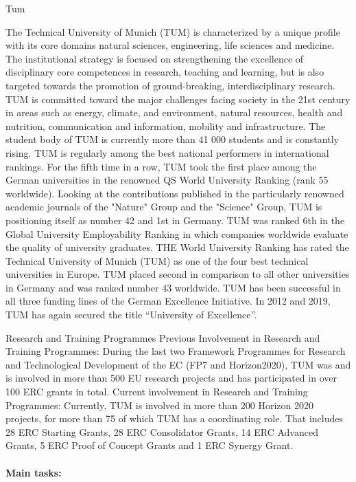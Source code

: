 \begin{sitedescription}{Tum}

The Technical University of Munich (TUM) is characterized by a unique profile with its core domains natural sciences, engineering, life sciences and medicine. The institutional strategy is focused on strengthening the excellence of disciplinary core competences in research, teaching and learning, but is also targeted towards the promotion of ground-breaking, interdisciplinary research. TUM is committed toward the major challenges facing society in the 21st century in areas such as energy, climate, and environment, natural resources, health and nutrition, communication and information, mobility and infrastructure.
The student body of TUM is currently more than 41 000 students and is constantly rising. TUM is regularly among the best national performers in international rankings. For the fifth time in a row, TUM took the first place among the German universities in the renowned QS World University Ranking (rank 55 worldwide). Looking at the contributions published in the particularly renowned academic journals of the "Nature" Group and the "Science" Group, TUM is positioning itself as number 42 and 1st in Germany. TUM was ranked 6th in the Global University Employability Ranking in which companies worldwide evaluate the quality of university graduates. THE World University Ranking has rated the Technical University of Munich (TUM) as one of the four best technical universities in Europe. TUM placed second in comparison to all other universities in Germany and was ranked number 43 worldwide. 
TUM has been successful in all three funding lines of the German Excellence Initiative. In 2012 and 2019, TUM has again secured the title ``University of Excellence''.

Research and Training Programmes
Previous Involvement in Research and Training Programmes:
During the last two Framework Programmes for Research and Technological Development of the EC (FP7 and Horizon2020), TUM was and is involved in more than 500 EU research projects and has participated in over 100 ERC grants in total.
Current involvement in Research and Training Programmes: 
Currently, TUM is involved in more than 200 Horizon 2020 projects, for more than 75 of which TUM has a coordinating role. That includes 28 ERC Starting Grants, 28 ERC Consolidator Grants, 14 ERC Advanced Grants, 5 ERC Proof of Concept Grants and 1 ERC Synergy Grant.


\paragraph{Main tasks:}


\end{sitedescription}

